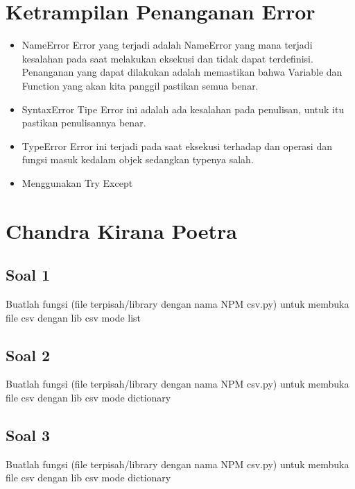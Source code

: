 \section{Ketrampilan Penanganan Error}

\begin{itemize}
\item NameError
Error yang terjadi adalah NameError yang mana terjadi kesalahan pada saat melakukan eksekusi dan tidak dapat terdefinisi.
Penanganan yang dapat dilakukan adalah memastikan bahwa Variable dan Function yang akan kita panggil pastikan semua benar.

\item SyntaxError
Tipe Error ini adalah ada kesalahan pada penulisan, untuk itu pastikan penulisannya benar.

\item TypeError
Error ini terjadi pada saat eksekusi terhadap dan operasi dan fungsi masuk kedalam objek sedangkan typenya salah.

\item Menggunakan Try Except 


\end{itemize}

\section{Chandra Kirana Poetra}

\subsection{Soal 1}
Buatlah fungsi (file terpisah/library dengan nama NPM csv.py) untuk membuka file csv dengan lib csv mode list


\subsection{Soal 2}
Buatlah fungsi (file terpisah/library dengan nama NPM csv.py) untuk membuka file csv dengan lib csv mode dictionary


\subsection{Soal 3}
Buatlah fungsi (file terpisah/library dengan nama NPM csv.py) untuk membuka file csv dengan lib csv mode dictionary



